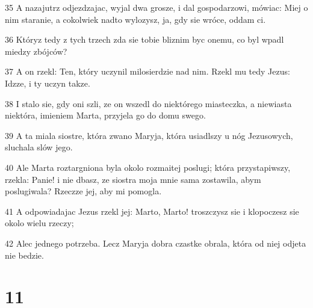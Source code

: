 \par 35 A nazajutrz odjezdzajac, wyjal dwa grosze, i dal gospodarzowi, mówiac: Miej o nim staranie, a cokolwiek nadto wylozysz, ja, gdy sie wróce, oddam ci.
\par 36 Któryz tedy z tych trzech zda sie tobie bliznim byc onemu, co byl wpadl miedzy zbójców?
\par 37 A on rzekl: Ten, który uczynil milosierdzie nad nim. Rzekl mu tedy Jezus: Idzze, i ty uczyn takze.
\par 38 I stalo sie, gdy oni szli, ze on wszedl do niektórego miasteczka, a niewiasta niektóra, imieniem Marta, przyjela go do domu swego.
\par 39 A ta miala siostre, która zwano Maryja, która usiadlszy u nóg Jezusowych, sluchala slów jego.
\par 40 Ale Marta roztargniona byla okolo rozmaitej poslugi; która przystapiwszy, rzekla: Panie! i nie dbasz, ze siostra moja mnie sama zostawila, abym poslugiwala? Rzeczze jej, aby mi pomogla.
\par 41 A odpowiadajac Jezus rzekl jej: Marto, Marto! troszczysz sie i klopoczesz sie okolo wielu rzeczy;
\par 42 Alec jednego potrzeba. Lecz Maryja dobra czastke obrala, która od niej odjeta nie bedzie.

\chapter{11}

